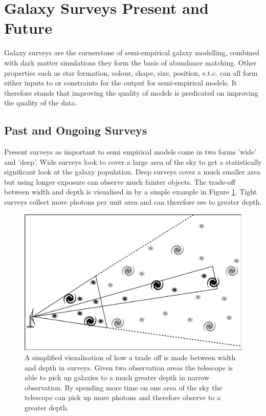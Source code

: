 \section{Galaxy Surveys Present and Future}
\label{sec:Surveys}
Galaxy surveys are the cornerstone of semi-empirical galaxy modelling, combined with dark matter simulations they form the basis of abundance matching. Other properties such as star formation, colour, shape, size, position, e.t.c. can all form either inputs to or constraints for the output for semi-empirical models. It therefore stands that improving the quality of models is predicated on improving the quality of the data.

\subsection{Past and Ongoing Surveys}
Present surveys as important to semi empirical models come in two forms 'wide' and 'deep'. Wide surveys look to cover a large area of the sky to get a statistically significant look at the galaxy population. Deep surveys cover a much smaller area but using longer exposure can observe much fainter objects. The trade-off between width and depth is visualised in by a simple example in Figure \ref{fig:WvD}. Tight surveys collect more photons per unit area and can therefore see to greater depth.

\begin{figure}[h]
    \centering
    \includegraphics[width = \linewidth]{Figures/Chapter1/W_v_D_Toon.png}
    \caption{A simplified visualisation of how a trade off is made between width and depth in surveys. Given two observation areas the telescope is able to pick up galaxies to a much greater depth in narrow observation. By spending more time on one area of the sky the telescope can pick up more photons and therefore observe to a greater depth.}
    \label{fig:WvD}
\end{figure}

